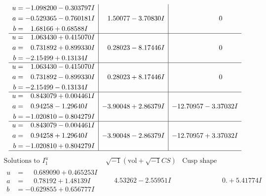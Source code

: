 \documentclass[1p]{elsarticle_modified}
\theoremstyle{definition}
\newcommand{\I}{\sqrt{-1}}
\begin{document}
$$\begin{array}{c|c|c}
\begin{aligned}
u &= -1.098200 - 0.303797 I \\
a &= -0.529365 - 0.760181 I \\
b &= \phantom{-}1.68166 + 0.68588 I\end{aligned}
 & \phantom{-}1.50077 - 3.70830 I & \phantom{-0.000000 } 0 \\ \hline\begin{aligned}
u &= \phantom{-}1.063430 + 0.415070 I \\
a &= \phantom{-}0.731892 + 0.899330 I \\
b &= -2.15499 + 0.13134 I\end{aligned}
 & \phantom{-}0.28023 - 8.17446 I & \phantom{-0.000000 } 0 \\ \hline\begin{aligned}
u &= \phantom{-}1.063430 - 0.415070 I \\
a &= \phantom{-}0.731892 - 0.899330 I \\
b &= -2.15499 - 0.13134 I\end{aligned}
 & \phantom{-}0.28023 + 8.17446 I & \phantom{-0.000000 } 0 \\ \hline\begin{aligned}
u &= \phantom{-}0.843079 + 0.004461 I \\
a &= \phantom{-}0.94258 - 1.29640 I \\
b &= -1.020810 - 0.804279 I\end{aligned}
 & -3.90048 + 2.86379 I & -12.70957 - 3.37032 I \\ \hline\begin{aligned}
u &= \phantom{-}0.843079 - 0.004461 I \\
a &= \phantom{-}0.94258 + 1.29640 I \\
b &= -1.020810 + 0.804279 I\end{aligned}
 & -3.90048 - 2.86379 I & -12.70957 + 3.37032 I\\
 \hline 
 \end{array}$$\newpage$$\begin{array}{c|c|c}  
\text{Solutions to }I^u_{1}& \I (\text{vol} + \sqrt{-1}CS) & \text{Cusp shape}\\
 \hline 
\begin{aligned}
u &= \phantom{-}0.689090 + 0.465253 I \\
a &= \phantom{-}0.78192 + 1.48139 I \\
b &= -0.629855 + 0.656777 I\end{aligned}
 & \phantom{-}4.53262 - 2.55951 I & \phantom{-0.000000 -}0. + 5.41774 I \\ \hline\begin{aligned}

\end{aligned}
\end{array}$$
\end{document}
